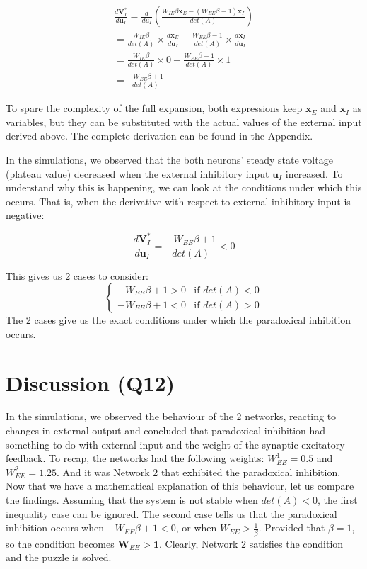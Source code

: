 \documentclass[10pt,twocolumn]{article}
\begin{document}
$$
    \begin{gathered}
        \frac{d\textbf{V}^\ast_I}{d\textbf{u}_I}
        = \frac{d}{du_I}\left(\frac{W_{IE}\beta \textbf{x}_E - (W_{EE}\beta - 1) \textbf{x}_I}{det(A)}\right)\\
        = \frac{W_{IE}\beta}{det(A)}\times\frac{d\textbf{x}_E}{d\textbf{u}_I} 
        - \frac{W_{EE}\beta - 1}{det(A)}\times\frac{d\textbf{x}_I}{d\textbf{u}_I}\\
        = \frac{W_{IE}\beta}{det(A)}\times 0 
        - \frac{W_{EE}\beta - 1}{det(A)}\times 1\\ 
        = \boxed{\frac{-W_{EE}\beta + 1}{det(A)}}
    \end{gathered}
$$

To spare the complexity of the full expansion, both expressions keep 
$\textbf{x}_E$ and $\textbf{x}_I$ as variables, but they can be 
substituted with the actual values of the external input
derived above. The complete derivation can be found in the Appendix.

In the simulations, we observed that the both neurons' steady state
voltage (plateau value) decreased when the external inhibitory input $\textbf{u}_I$ increased.
To understand why this is happening, we can look at the conditions
under which this occurs. That is, when the derivative with respect to
external inhibitory input is negative:

$$
    \frac{d\textbf{V}^\ast_I}{d\textbf{u}_I}=\frac{-W_{EE}\beta + 1}{det(A)} < 0
$$

This gives us 2 cases to consider:
$$
    \begin{cases}
        -W_{EE}\beta + 1 > 0 & \text{if } det(A) < 0 \\
        -W_{EE}\beta + 1 < 0 & \text{if } det(A) > 0
    \end{cases}
$$
The 2 cases give us the exact conditions under which the paradoxical inhibition occurs.

\section{Discussion (Q12)}
In the simulations, we observed the behaviour of the 2 networks,
reacting to changes in external output and concluded that 
paradoxical inhibition had something to do with external input
and the weight of the synaptic excitatory feedback. 
To recap, the networks had the following weights: $W^1_{EE} = 0.5$ and $W^2_{EE} = 1.25$.
And it was Network 2 that exhibited the paradoxical inhibition.
Now that we have a mathematical explanation of this behaviour, let us 
compare the findings. Assuming that the system is not stable when $det(A) < 0$, 
the first inequality case can be ignored. The second case tells us that
the paradoxical inhibition occurs when $-W_{EE}\beta + 1 < 0$,
or when $W_{EE} > \frac{1}{\beta}$. Provided that $\beta = 1$, so
the condition becomes $\textbf{W}_{EE} > \textbf{1}$.
Clearly, Network 2 satisfies the condition and the puzzle is solved.
\end{document}
